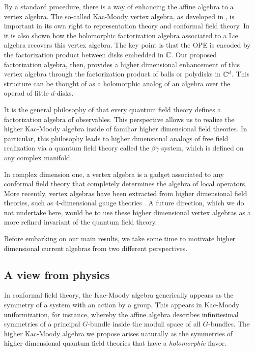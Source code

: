 By a standard procedure, there is a way of enhancing the affine algebra to a vertex algebra. 
The so-called Kac-Moody vertex algebra, as developed in \cite{IgorKM, KacVertex, BorcherdsVertex}, is important in its own right to representation theory and conformal field theory. 
In \cite{CG1} it is also shown how the holomorphic factorization algebra associated to a Lie algebra recovers this vertex algebra. 
The key point is that the OPE is encoded by the factorization product between disks embedded in $\mathbb C$. 
Our proposed factorization algebra, then, provides a higher dimensional enhancement of this vertex algebra through the factorization product of balls or polydisks in $\mathbb C^d$. 
This structure can be thought of as a holomorphic analog of an algebra over the operad of little $d$-disks.

It is the general philosophy of \cite{CG1,CG2} that every quantum field theory defines a factorization algebra of observables.
This perspective allows us to realize the higher Kac-Moody algebra inside of familiar higher dimensional field theories. 
In particular, this philosophy leads to higher dimensional analogs of free field realization via a quantum field theory called the $\beta\gamma$ system, which is defined on any complex manifold. 

In complex dimension one, a vertex algebra is a gadget associated to any conformal field theory that completely determines the algebra of local operators.  
More recently, vertex algebras have been extracted from higher dimensional field theories, such as $4$-dimensional gauge theories \cite{Beem1,Beem2}. 
A future direction, which we do not undertake here, would be to use these higher dimensional vertex algebras as a more refined invariant of the quantum field theory. 

Before embarking on our main results, we take some time to motivate higher dimensional current algebras from two different perspectives. 


\subsection*{A view from physics}

In conformal field theory, the Kac-Moody algebra generically appears as the symmetry of a system with an action by a group. 
This appears in Kac-Moody uniformization, for instance, whereby the affine algebra describes infinitesimal symmetries of a principal $G$-bundle inside the moduli space of all $G$-bundles. 
The higher Kac-Moody algebra we propose arises naturally as the symmetries of higher dimensional quantum field theories that have a {\em holomorphic} flavor. 

